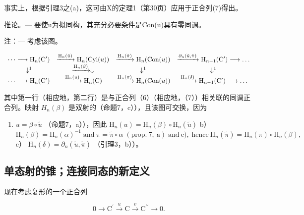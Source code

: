 事实上，根据引理3之(a)，这可由X的定理1（第30页）应用于正合列(7)得出。

推论。--- 要使u为拟同构，其充分必要条件是Con(u)具有零同调。

注：--- 考虑该图。

\[
\begin{array}{c c c c c} \dots \longrightarrow \mathrm{H} _ {n} (\mathrm{C} ^ {\prime}) & \xrightarrow {\mathrm{H} _ {n} (\tilde {u})} \mathrm{H} _ {n} (\text {Cyl} (u)) & \xrightarrow {\mathrm{H} _ {n} (\tilde {\pi})} \mathrm{H} _ {n} (\text {Con} (u)) & \xrightarrow {\partial_ {n} (\tilde {u} , \tilde {\pi})} \mathrm{H} _ {n - 1} (\mathrm{C} ^ {\prime}) \longrightarrow \dots \\ \downarrow^ {1} & \xrightarrow {\mathrm{H} _ {n} (\beta)} \downarrow & \downarrow^ {1} & \downarrow^ {1} \\ \dots \longrightarrow \mathrm{H} _ {n} (\mathrm{C} ^ {\prime}) & \xrightarrow {\mathrm{H} _ {n} (u)} \mathrm{H} _ {n} (\mathrm{C}) & \xrightarrow {\mathrm{H} _ {n} (\pi)} \mathrm{H} _ {n} (\text {Con} (u)) & \xrightarrow {\mathrm{H} _ {n} (\delta)} \mathrm{H} _ {n - 1} (\mathrm{C} ^ {\prime}) \longrightarrow \dots \end{array}
\]

其中第一行（相应地，第二行）是与正合列（6）（相应地，（7））相关联的同调正合列。映射 \(H_{n}(\beta)\) 是双射的（命题7，c）），且该图可交换，因为

\begin{enumerate}
\def\labelenumi{\alph{enumi})}
\tightlist
\item
  \(u = \beta \circ \tilde{u}\) （命题7，a）），因此 \(\mathrm{H}_n(u) = \mathrm{H}_n(\beta) \circ \mathrm{H}_n(\tilde{u})\) b） \(\mathrm{H}_{n}(\beta)=\mathrm{H}_{n}(\alpha)^{-1}\;\mathrm{and}\;\pi=\tilde{\pi}\circ\alpha\;(\mathrm{prop.~7,~a})\;\mathrm{and~c}),\;\mathrm{hence~}\mathrm{H}_{n}(\tilde{\pi})=\mathrm{H}_{n}(\pi)\circ\mathrm{H}_{n}(\beta),\) c） \(\mathrm{H}_{n}(\delta)=\partial_{n}(\tilde{u},\tilde{\pi})\) （引理3，b））。
\end{enumerate}

\subsection{单态射的锥；连接同态的新定义}

现在考虑复形的一个正合列

\[
0 \rightarrow \mathrm{C} ^ {\prime} \xrightarrow {u} \mathrm{C} \xrightarrow {v} \mathrm{C} ^ {\prime \prime} \rightarrow 0.\tag{9}
\]

